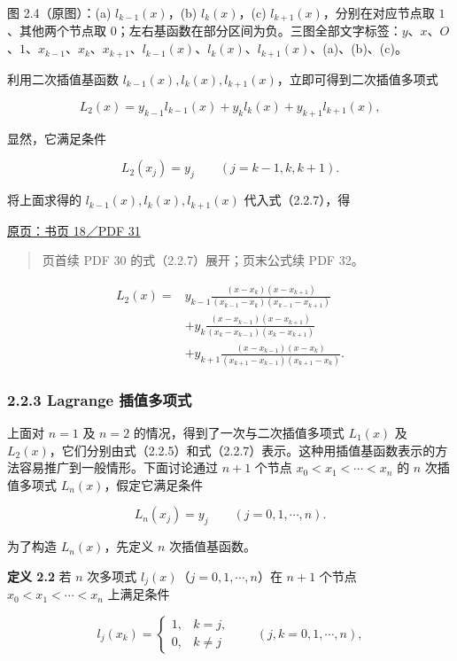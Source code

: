 \documentclass[
  10pt,
  fontset=fandol]{ctexart}
\begin{document}
图 2.4（原图）：(a) \(l_{k-1}(x)\)，(b) \(l_k(x)\)，(c) \(l_{k+1}(x)\)，分别在对应节点取 \(1\)、其他两个节点取 \(0\)；左右基函数在部分区间为负。三图全部文字标签：\(y\)、\(x\)、\(O\)、\(1\)、\(x_{k-1}\)、\(x_k\)、\(x_{k+1}\)、\(l_{k-1}(x)\)、\(l_k(x)\)、\(l_{k+1}(x)\)、(a)、(b)、(c)。

利用二次插值基函数 \(l_{k-1}(x),l_k(x),l_{k+1}(x)\)，立即可得到二次插值多项式

\[
L_2(x)=y_{k-1}l_{k-1}(x)+y_kl_k(x)+y_{k+1}l_{k+1}(x),
\tag{2.2.7}
\]

显然，它满足条件

\[
L_2(x_j)=y_j\qquad(j=k-1,k,k+1).
\]

将上面求得的 \(l_{k-1}(x),l_k(x),l_{k+1}(x)\) 代入式（2.2.7），得

\href{../../source-images/pdf-031.jpeg}{原页：书页 18／PDF 31}

\begin{quote}
页首续 PDF 30 的式（2.2.7）展开；页末公式续 PDF 32。
\end{quote}

\[
\begin{aligned}
L_2(x)={}&y_{k-1}
\frac{(x-x_k)(x-x_{k+1})}
{(x_{k-1}-x_k)(x_{k-1}-x_{k+1})}\\
&+y_k
\frac{(x-x_{k-1})(x-x_{k+1})}
{(x_k-x_{k-1})(x_k-x_{k+1})}\\
&+y_{k+1}
\frac{(x-x_{k-1})(x-x_k)}
{(x_{k+1}-x_{k-1})(x_{k+1}-x_k)}.
\end{aligned}
\]

\subsubsection{2.2.3 Lagrange 插值多项式}\label{lagrange-ux63d2ux503cux591aux9879ux5f0f}

上面对 \(n=1\) 及 \(n=2\) 的情况，得到了一次与二次插值多项式 \(L_1(x)\) 及 \(L_2(x)\)，它们分别由式（2.2.5）和式（2.2.7）表示。这种用插值基函数表示的方法容易推广到一般情形。下面讨论通过 \(n+1\) 个节点 \(x_0<x_1<\cdots<x_n\) 的 \(n\) 次插值多项式 \(L_n(x)\)，假定它满足条件

\[
L_n(x_j)=y_j\qquad(j=0,1,\cdots,n).
\tag{2.2.8}
\]

为了构造 \(L_n(x)\)，先定义 \(n\) 次插值基函数。

\textbf{定义 2.2} 若 \(n\) 次多项式 \(l_j(x)\)（\(j=0,1,\cdots,n\)）在 \(n+1\) 个节点 \(x_0<x_1<\cdots<x_n\) 上满足条件

\[
l_j(x_k)=
\begin{cases}
1,&k=j,\\
0,&k\ne j
\end{cases}
\qquad(j,k=0,1,\cdots,n),
\tag{2.2.9}
\]
\end{document}
